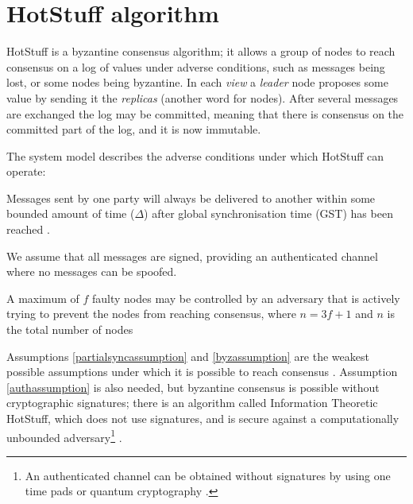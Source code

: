 \section{HotStuff algorithm} \label{hotstufftheory}
HotStuff is a byzantine consensus algorithm; it allows a group of nodes to reach consensus on a log of values under adverse conditions, such as messages being lost, or some nodes being byzantine. In each \textit{view} a \textit{leader} node proposes some value by sending it the \textit{replicas} (another word for nodes). After several messages are exchanged the log may be committed, meaning that there is consensus on the committed part of the log, and it is now immutable.

The system model describes the adverse conditions under which HotStuff can operate:
\begin{assumption} \label{partialsyncassumption}
	Messages sent by one party will always be delivered to another within some bounded amount of time ($\Delta$) after global synchronisation time (GST) has been reached \cite{dworkConsensusPresencePartial1988}.
\end{assumption}

\begin{assumption}[Authenticated] \label{authassumption}
	We assume that all messages are signed, providing an authenticated channel where no messages can be spoofed.
\end{assumption}

\begin{assumption}[Byzantine] \label{byzassumption}
	A maximum of $f$ faulty nodes may be controlled by an adversary that is actively trying to prevent the nodes from reaching consensus, where $n = 3f + 1$ and $n$ is the total number of nodes
\end{assumption}

Assumptions \ref{partialsyncassumption} and \ref{byzassumption} are the weakest possible assumptions under which it is possible to reach consensus \cite{peaseReachingAgreementPresence1980,fischerEasyImpossibilityProofs1986}. Assumption \ref{authassumption} is also needed, but byzantine consensus is possible without cryptographic signatures; there is an algorithm called Information Theoretic HotStuff, which does not use signatures, and is secure against a computationally unbounded adversary\footnote{An authenticated channel can be obtained without signatures by using one time pads or quantum cryptography \cite{bennettExperimentalQuantumCryptography1992}.} \cite{abrahamInformationTheoreticHotStuff2020}.

